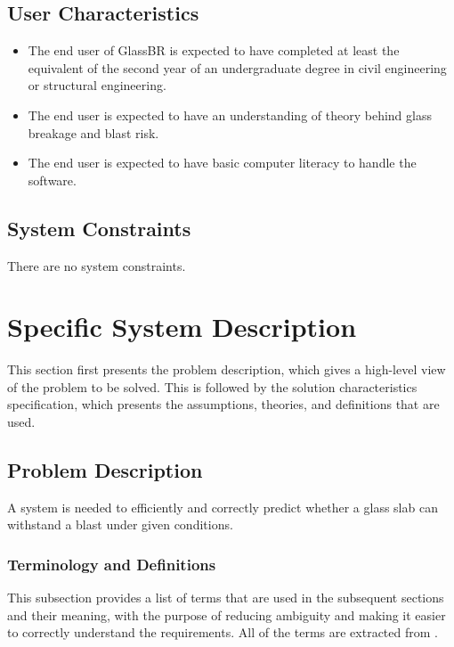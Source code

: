 \documentclass[12pt]{article}
\begin{document}
\subsection{User Characteristics}
\label{Sec:UserChars}
\begin{itemize}
\item{The end user of GlassBR is expected to have completed at least the equivalent of the second year of an undergraduate degree in civil engineering or structural engineering.}
\item{The end user is expected to have an understanding of theory behind glass breakage and blast risk.}
\item{The end user is expected to have basic computer literacy to handle the software.}
\end{itemize}
\subsection{System Constraints}
\label{Sec:SysConstraints}
There are no system constraints.

\section{Specific System Description}
\label{Sec:SpecSystDesc}
This section first presents the problem description, which gives a high-level view of the problem to be solved. This is followed by the solution characteristics specification, which presents the assumptions, theories, and definitions that are used.

\subsection{Problem Description}
\label{Sec:ProbDesc}
A system is needed to efficiently and correctly predict whether a glass slab can withstand a blast under given conditions.

\subsubsection{Terminology and Definitions}
\label{Sec:TermDefs}
This subsection provides a list of terms that are used in the subsequent sections and their meaning, with the purpose of reducing ambiguity and making it easier to correctly understand the requirements. All of the terms are extracted from \cite{astm2009}.
\end{document}
